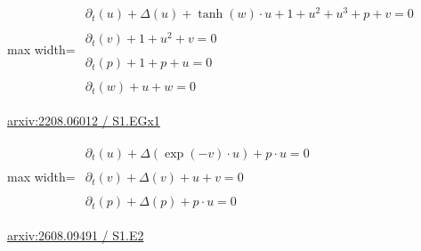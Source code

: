 \documentclass[10pt,a4paper]{article}
\begin{document}
\begin{minipage}{\linewidth}
\begin{center}\begin{adjustbox}{max width=\linewidth}$\displaystyle\begin{gathered}\begin{gathered}\partial_{t}(u)+\Delta(u)+\tanh(w)\cdot u+1+u^{2}+u^{3}+p+v=0\end{gathered}\\[5pt]\begin{gathered}\partial_{t}(v)+1+u^{2}+v=0\end{gathered}\\[5pt]\begin{gathered}\partial_{t}(p)+1+p+u=0\end{gathered}\\[5pt]\begin{gathered}\partial_{t}(w)+u+w=0\end{gathered}\end{gathered}$\end{adjustbox}\end{center}
{\small \href{https://arxiv.org/html/2208.06012#S1.EGx1}{arxiv:2208.06012 / S1.EGx1}}\par
\end{minipage}\par\vspace{7mm}

\begin{minipage}{\linewidth}
\begin{center}\begin{adjustbox}{max width=\linewidth}$\displaystyle\begin{gathered}\begin{gathered}\partial_{t}(u)+\Delta(\exp(-v)\cdot u)+p\cdot u=0\end{gathered}\\[5pt]\begin{gathered}\partial_{t}(v)+\Delta(v)+u+v=0\end{gathered}\\[5pt]\begin{gathered}\partial_{t}(p)+\Delta(p)+p\cdot u=0\end{gathered}\end{gathered}$\end{adjustbox}\end{center}
{\small \href{https://arxiv.org/html/2608.09491#S1.E2}{arxiv:2608.09491 / S1.E2}}\par
\end{minipage}\par\vspace{7mm}
\end{document}
